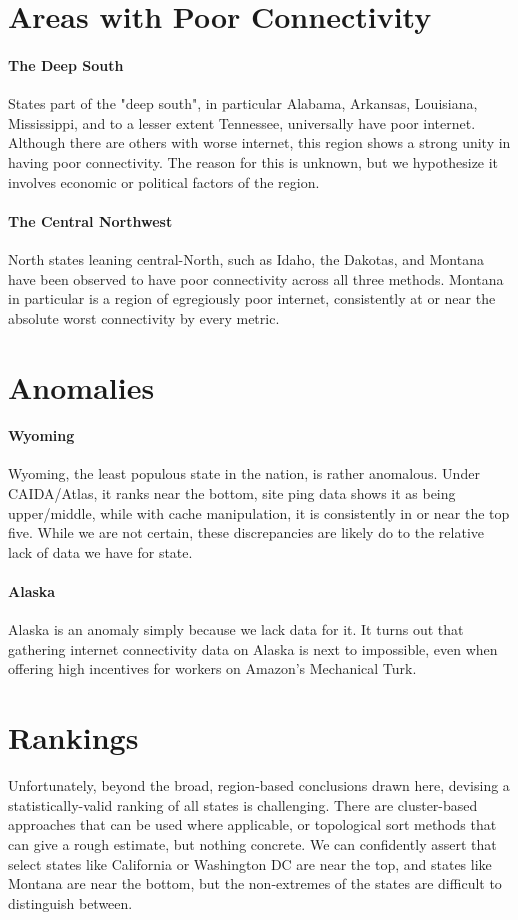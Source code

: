 \section{Areas with Poor Connectivity}

\paragraph{The Deep South} States part of the "deep south", in particular Alabama, Arkansas, Louisiana, Mississippi, and to a lesser extent Tennessee, universally have poor internet. Although there are others with worse internet, this region shows a strong unity in having poor connectivity. The reason for this is unknown, but we hypothesize it involves economic or political factors of the region.

\paragraph{The Central Northwest} North states leaning central-North, such as Idaho, the Dakotas, and Montana have been observed to have poor connectivity across all three methods. Montana in particular is a region of egregiously poor internet, consistently at or near the absolute worst connectivity by every metric.

\section{Anomalies}

\paragraph{Wyoming} Wyoming, the least populous state in the nation, is rather anomalous. Under CAIDA/Atlas, it ranks near the bottom, site ping data shows it as being upper/middle, while with \dns cache manipulation, it is consistently in or near the top five. While we are not certain, these discrepancies are likely do to the relative lack of data we have for state.

\paragraph{Alaska} Alaska is an anomaly simply because we lack data for it. It turns out that gathering internet connectivity data on Alaska is next to impossible, even when offering high incentives for workers on Amazon's Mechanical Turk.

\section{Rankings}

Unfortunately, beyond the broad, region-based conclusions drawn here, devising a statistically-valid ranking of all states is challenging. There are cluster-based approaches that can be used where applicable, or topological sort methods that can give a rough estimate, but nothing concrete. We can confidently assert that select states like California or Washington DC are near the top, and states like Montana are near the bottom, but the non-extremes of the states are difficult to distinguish between.

